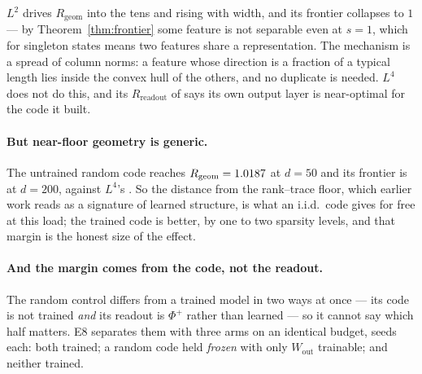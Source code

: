 \documentclass[preprint,12pt]{elsarticle}
\theoremstyle{definition}
\begin{document}
$L^2$ drives $R_{\mathrm{geom}}$ into the tens and rising with width, and its frontier collapses to
$1$ --- by Theorem~\ref{thm:frontier} some feature is not separable even at $s=1$, which for
singleton states means two features share a representation. The mechanism is a spread of column
norms: a feature whose direction is a fraction of a typical length lies inside the convex hull of
the others, and no duplicate is needed. $L^4$ does not do this, and its
$R_{\mathrm{readout}}$ of \SALfourFiftyRreadout{} says its own output layer is near-optimal for the
code it built.

\paragraph{But near-floor geometry is generic.} The untrained random code reaches
$R_{\mathrm{geom}}=1.0187{}$ at $d=50$ and its frontier is
\FullRandTwoHundredKappaMin{} at $d=200$, against $L^4$'s \FullLfourTwoHundredKappaMin{}. So the
distance from the rank--trace floor, which earlier work reads as a signature of learned structure,
is what an i.i.d.\ code gives for free at this load; the trained code is better, by one to two
sparsity levels, and that margin is the honest size of the effect.

\paragraph{And the margin comes from the code, not the readout.} The random control differs from a
trained model in two ways at once --- its code is not trained \emph{and} its readout is
$\Phi^{+}$ rather than learned --- so it cannot say which half matters. E8 separates them with three
arms on an identical budget, \EeightSeeds{} seeds each: both trained; a random code held
\emph{frozen} with only $W_{\mathrm{out}}$ trainable; and neither trained.
\end{document}
